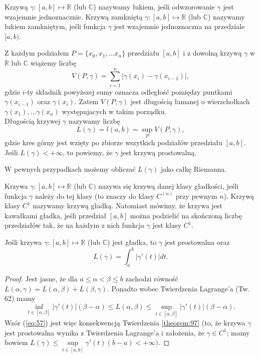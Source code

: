 \documentclass[leqno]{article}
\begin{document}
\begin{justify}
\begin{defn}
Krzywą $\gamma : [a,b] \mapsto \mathbb{R}$ (lub $\mathbb{C}$) nazywamy łukiem, jeśli odwzorowanie $\gamma$ jest wzajemnie
jednoznacznie. Krzywą zamkniętą $\gamma : [a,b] \mapsto \mathbb{R}$ (lub $\mathbb{C}$) nazywamy łukiem zamkniętym, jeśli funkcja $\gamma$ jest wzajemnie jednoznaczna na przedziale $[a,b)$.
\end{defn}

\begin{defn}
    Z każdym podziałem $P = \{x_0, x_1, \ldots x_n\}$ przedziału $[a,b]$ i z dowolną krzywą $\gamma$ w
    $\mathbb{R}$ lub $\mathbb{C}$ wiążemy liczbę
    \[
        V(P, \gamma) = \sum_{i=1}^{n}|\gamma(x_i)-\gamma(x_{i-1})|,
    \]
    gdzie $i$-ty składnik powyższej sumy oznacza odległość pomiędzy puntkami $\gamma(x_{i-1})$ oraz
    $\gamma(x_{i})$. Zatem $V(P, \gamma)$ jest długością łamanej o wierzchołkach $\gamma(x_1), \ldots \gamma(x_n)$ występujacych w takim porządku. \\
    Długością krzywej $\gamma$ nazywamy liczbę
    \[
        L(\gamma) = l(a,b) = \sup_P V(P, \gamma),
    \]
    gdzie kres górny jest wzięty po zbiorze wszytkich podziałów przedziału $[a,b]$.
    Jeśli $L(\gamma) < +\infty$, to powiemy, że $\gamma$ jest krzywą prostowalną. 
\end{defn}

W pewnych przypadkach możemy obliczać $L(\gamma)$ jako całkę Riemanna.

\begin{defn}
Krzywa $\gamma : [a,b] \mapsto \mathbb{R}$ (lub $\mathbb{C})$ nazywa się krzywą danej klasy gładkości,
jeśli funkcja $\gamma$ należy do tej klasy (to znaczy do klasy $C^{(n)}$ przy pewnym $n$).
Krzywą klasy $C^1$ nazywamy krzywą gładką. Natomiast mówimy, że krzywa jest kawałkami gładka, jeśli przedział $[a,b]$ można 
podzielić na skończoną liczbę przedziałów tak, że na każdym z nich funkcja $\gamma$ jest klasy $C^1$.
\end{defn}

\begin{theorem}
{
    Jeśli krzywa $\gamma : [a,b] \mapsto \mathbb{R}$ (lub $\mathbb{C}$) jest gładka, to $\gamma$ jest prostowalna oraz
    \begin{equation}\label{eq:57}
        L(\gamma) = \int_{a}^{b}|\gamma'(t)|dt.
    \end{equation}
}
\end{theorem}

\begin{proof}
    Jest jasne, że dla $a \leqslant \alpha < \beta \leqslant b$ zachodzi równość $L(\alpha, \gamma) = L(\alpha, \beta) + L(\beta, \gamma)$.
    Ponadto wobec Twierdzenia Lagrange'a (Tw. 62) mamy
    \[
        \inf_{t \in [\alpha, \beta]} |\gamma'(t)|(\beta - \alpha) \leqslant L(\alpha, \beta) \leqslant \sup_{t \in [\alpha, \beta]} |\gamma'(t)|(\beta - \alpha).
    \]
    Wzór (\ref{eq:57}) jest więc konsekwencją Twierdzenia \ref{theorem:97} (to, że krzywa $\gamma$ jest prostowalna wynika z Twierdzenia Lagrange'a i założenia, że
    $\gamma \in C^1$; mamy bowiem $L(\gamma) \leqslant \sup\limits_{t \in [a,b]} \gamma'(t)(b-a) < +\infty)$.
\end{proof}


\end{justify}
\end{document}
